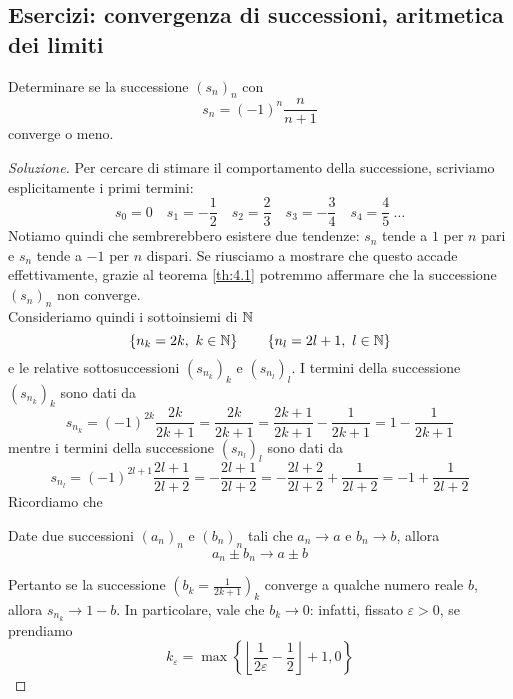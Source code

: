 \subsection{Esercizi: convergenza di successioni, aritmetica dei limiti}
\begin{exercise}
    \label{ex:4.1}
    Determinare se la successione $(s_n)_n$ con
    \[
    s_n = (-1)^n \frac{n}{n+1}
    \]
    converge o meno.
\end{exercise}
\begin{proof}[Soluzione]
    Per cercare di stimare il comportamento della successione, scriviamo esplicitamente i primi termini:
    \[
    s_0 = 0 \quad s_1 = -\frac{1}{2} \quad s_2 = \frac{2}{3} \quad s_3 = -\frac{3}{4} \quad s_4 = \frac{4}{5} \ \dots
    \]
    Notiamo quindi che sembrerebbero esistere due tendenze: $s_n$ tende a $1$ per $n$ pari e $s_n$ tende a $-1$ per $n$ dispari. Se riusciamo a mostrare che questo accade effettivamente, grazie al teorema \ref{th:4.1} potremmo affermare che la successione $(s_n)_n$ non converge.\\
    Consideriamo quindi i sottoinsiemi di $\amsbb{N}$
    \[
    \left\{n_k = 2k, \ k\in\amsbb{N}\right\} \qquad \left\{n_l = 2l+1, \ l\in\amsbb{N}\right\}
    \]
    e le relative sottosuccessioni $(s_{n_k})_k$ e $(s_{n_l})_l$. I termini della successione $(s_{n_k})_k$ sono dati da
        \[
        s_{n_k} = (-1)^{2k} \frac{2k}{2k+1} = \frac{2k}{2k+1} = \frac{2k+1}{2k+1}-\frac{1}{2k+1} = 1-\frac{1}{2k+1}
        \]
    mentre i termini della successione $(s_{n_l})_l$ sono dati da
    \[
    s_{n_l} = (-1)^{2l+1}\frac{2l+1}{2l+2} = -\frac{2l+1}{2l+2} = -\frac{2l+2}{2l+2} + \frac{1}{2l+2} = -1 + \frac{1}{2l+2}
    \]
    Ricordiamo che
    \begin{tcolorbox}
        \begin{theorem}
            \label{th:4.2}
            Date due successioni $(a_n)_n$ e $(b_n)_n$ tali che $a_n \to a$ e $b_n \to b$, allora
            \[
            a_n \pm b_n \to a \pm b
            \]
        \end{theorem}
    \end{tcolorbox}
    Pertanto se la successione $\left(b_k = \frac{1}{2k+1}\right)_k$ converge a qualche numero reale $b$, allora $s_{n_k} \to 1-b$. In particolare, vale che $b_k \to 0$: infatti, fissato $\varepsilon>0$, se prendiamo
    \begin{equation}
        \label{eq:4.3}
        k_\varepsilon = \max\left\{ \left\lfloor\frac{1}{2\varepsilon}-\frac{1}{2} \right\rfloor+1, 0\right\}
    \end{equation}

\end{proof}
